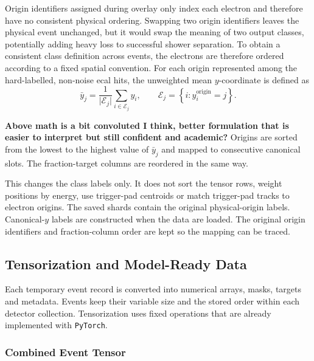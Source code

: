 Origin identifiers assigned during overlay only index each electron and therefore have no consistent physical ordering. Swapping two origin identifiers leaves the physical event unchanged, but it would swap the meaning of two output classes, potentially adding heavy loss to successful shower separation. To obtain a
consistent class definition across events, the electrons are therefore ordered
according to a fixed spatial convention. For each origin represented among
the hard-labelled, non-noise \gls{ecal} hits, the unweighted mean
\(y\)-coordinate is defined as
\begin{equation}
    \bar y_j =
    \frac{1}{\lvert \mathcal{E}_j\rvert}
    \sum_{i\in\mathcal{E}_j} y_i,
    \qquad
    \mathcal{E}_j =
    \left\{i:y_i^{\mathrm{origin}}=j\right\}.
\end{equation}

\textbf{Above math is a bit convoluted I think, better formulation that is easier to interpret but still confident and academic?}
Origins are sorted from the lowest to the highest value of \(\bar y_j\) and
mapped to consecutive canonical slots. The fraction-target columns are
reordered in the same way.

This changes the class labels only. It does not sort the tensor rows, weight
positions by energy, use trigger-pad centroids or match trigger-pad tracks to
electron origins. The saved shards contain the original physical-origin
labels. Canonical-\(y\) labels are constructed when the data are loaded. The
original origin identifiers and fraction-column order are kept so the mapping
can be traced.

\subsection{Tensorization and Model-Ready Data}
\label{sec:method_features}

Each temporary event record is converted into numerical arrays, masks, targets and metadata. Events keep their variable size and the stored order within each detector collection. Tensorization uses fixed operations that are already implemented with \texttt{PyTorch}.

\subsubsection{Combined Event Tensor}

